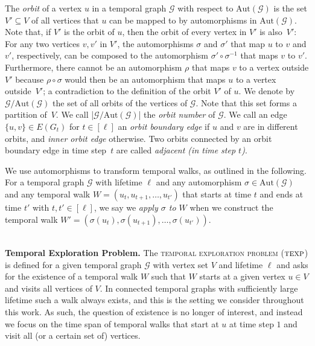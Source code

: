 \documentclass[10pt,a4paper]{article}
\newcommand{\texp}{\textsc{texp}}
\newcommand{\auttg}{\ensuremath{\text{Aut}(\mathcal{G})}}
\newcommand{\torb}{\ensuremath{\mathcal{G}/\auttg}}
\begin{document}
The \textit{orbit} of a vertex $u$ in a temporal graph $\mathcal{G}$ with
respect to $\auttg$ is the set $V' \subseteq V$ of all vertices that $u$ can be
mapped to by automorphisms in $\auttg$. Note that, if $V'$ is the orbit of $u$,
then the orbit of every vertex in $V'$ is also~$V'$: For any two vertices $v,v'$
in $V'$, the automorphisms $\sigma$ and $\sigma'$ that map $u$ to $v$ and $v'$,
respectively, can be composed to the automorphism $\sigma' \circ \sigma^{-1}$
that maps $v$ to $v'$. Furthermore, there cannot be an automorphism $\rho$ that
maps $v$ to a vertex outside $V'$ because $\rho\circ \sigma$ would then be an
automorphism that maps $u$ to a vertex outside~$V'$; {a contradiction to
the definition of the orbit $V'$ of $u$.}
We denote by $\torb$ the set of all orbits
of the vertices of $\mathcal{G}$. Note that this set forms a partition of~$V$.
We call |$\torb$| the {\em{orbit number}} of $\mathcal{G}$. We call an edge
$\{u, v\} \in E(G_t)$ for $t \in [\ell]$ an \textit{orbit boundary edge} if $u$
and $v$ are in different orbits, and \textit{inner orbit edge} otherwise. Two
orbits connected by an orbit boundary edge {in time step~$t$} are called
{\emph{adjacent (in time step $t$)}.}

We use automorphisms to transform temporal walks, as outlined in the following.
For a temporal graph $\mathcal{G}$ with lifetime $\ell$ and any automorphism
$\sigma \in \auttg$ and any temporal walk $W=(u_t, u_{t+1}, \ldots, u_{t'})$
that starts at time $t$ and ends at time $t'$ with $t, t' \in [\ell]$, we say we
\textit{apply $\sigma$ to $W$} when we construct the temporal walk
$W'=(\sigma(u_t), \sigma(u_{t+1}), \dots, \sigma(u_{t'}))$.



~\\ \noindent \textbf{Temporal Exploration Problem.}
The \textsc{temporal exploration problem} ($\texp$) is defined for a given
temporal graph $\mathcal{G}$ with vertex set $V$ and lifetime $\ell$ and asks
for the existence of a temporal walk $W$ such that $W$ starts at a given vertex
$u \in V$ and visits all vertices of $V$. In connected temporal graphs with
sufficiently large lifetime such a walk always exists, and this is the setting
we consider throughout this work. As such, the question of existence is no
longer of interest, and instead we focus on the time span of temporal walks that
start at $u$ at time step $1$ and visit all (or a certain set of) vertices.
\end{document}
